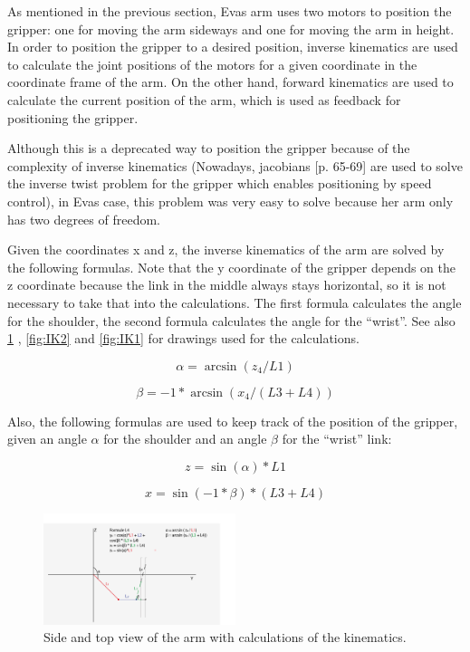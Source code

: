 \documentclass[project_eva.tex]{subfiles}
\begin{document}
As mentioned in the previous section, Eva\textquotesingle s arm uses two motors to position the gripper: one for moving the arm sideways and one for moving the arm in height. In order to position the gripper to a desired position, inverse kinematics are used to calculate the joint positions of the motors for a given coordinate in the coordinate frame of the arm. On the other hand, forward kinematics are used to calculate the current position of the arm, which is used as feedback for positioning the gripper. 

Although this is a deprecated way to position the gripper because of the complexity of inverse kinematics  (Nowadays, 
jacobians \cite{jacobian} [p. 65-69] are used to solve the inverse twist 
problem for the gripper which enables positioning by speed control), in Eva\textquotesingle s case, this problem was very easy to solve because her arm only has two degrees of freedom. 

Given the coordinates x and z, the inverse kinematics of the arm are solved by the following formulas. Note that the y 
coordinate of the gripper depends on the z coordinate because the link in the middle always stays horizontal, so it is not 
necessary to take that into the calculations. The first formula calculates the angle for the shoulder, the second formula 
calculates the angle for the ``wrist''. See also \ref{fig:IK0} , \ref{fig:IK2} and \ref{fig:IK1} for drawings used for the 
calculations.

\begin{equation*}
\alpha = \arcsin(z_4/L1)
\end{equation*}

\begin{equation*}
\beta = -1 * \arcsin(x_4/(L3 + L4))
\end{equation*}

Also, the following formulas are used to keep track of the position of the gripper, given an angle $\alpha$ for the 
shoulder and an angle $\beta$ for the ``wrist'' link:

\begin{equation*}
z = \sin(\alpha)*L1
\end{equation*}

\begin{equation*}
x = \sin(-1 * \beta)*(L3 + L4)
\end{equation*}

\begin{figure}[h!]
	\centering
	\mbox{\includegraphics[width=0.5\textwidth]{Images/3d_zijenbovenaanzicht.png}}
	\caption{Side and top view of the arm with calculations of the kinematics.}
	\label{fig:IK0}
\end{figure}
\end{document}
